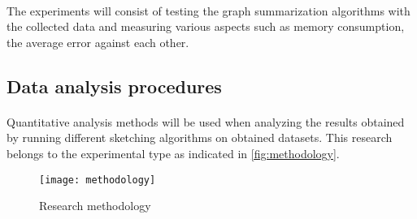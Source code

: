 \paragraph{}
The experiments will consist of testing the graph summarization algorithms with the collected data and measuring various aspects such as memory consumption, the average error against each other.

\subsection{Data analysis procedures}

\paragraph{}
Quantitative analysis methods will be used when analyzing the results obtained by running different sketching algorithms on obtained datasets. This research belongs to the experimental type as indicated in \autoref{fig:methodology}.

\begin{figure}[H]
    \centering \texttt{[image: methodology]}
    \caption{Research methodology}
    \label{fig:methodology}
\end{figure}